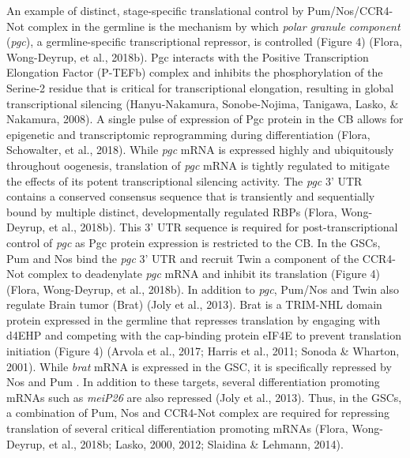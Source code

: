 \documentclass[12pt,oneside]{reedthesis}
\begin{document}
An example of distinct, stage-specific translational control by
Pum/Nos/CCR4-Not complex in the germline is the mechanism by which
\emph{polar granule component} (\emph{pgc}), a germline-specific transcriptional
repressor, is controlled (Figure 4) (Flora, Wong-Deyrup, et al., 2018b). Pgc interacts with
the Positive Transcription Elongation Factor (P-TEFb) complex and
inhibits the phosphorylation of the Serine-2 residue that is critical
for transcriptional elongation, resulting in global transcriptional
silencing (Hanyu-Nakamura, Sonobe-Nojima, Tanigawa, Lasko, \& Nakamura, 2008). A single pulse of expression of Pgc
protein in the CB allows for epigenetic and transcriptomic reprogramming
during differentiation (Flora, Schowalter, et al., 2018). While \emph{pgc} mRNA is expressed
highly and ubiquitously throughout oogenesis, translation of \emph{pgc} mRNA
is tightly regulated to mitigate the effects of its potent
transcriptional silencing activity. The \emph{pgc} 3' UTR contains a
conserved consensus sequence that is transiently and sequentially bound
by multiple distinct, developmentally regulated RBPs (Flora, Wong-Deyrup, et al., 2018b).
This 3' UTR sequence is required for post-transcriptional control of
\emph{pgc} as Pgc protein expression is restricted to the CB. In the GSCs,
Pum and Nos bind the \emph{pgc} 3' UTR and recruit Twin a component of the
CCR4-Not complex to deadenylate \emph{pgc} mRNA and inhibit its translation
(Figure 4) (Flora, Wong-Deyrup, et al., 2018b). In addition to \emph{pgc}, Pum/Nos and Twin also
regulate Brain tumor (Brat) (Joly et al., 2013). Brat is a TRIM-NHL domain
protein expressed in the germline that represses translation by engaging
with d4EHP and competing with the cap-binding protein eIF4E to prevent
translation initiation (Figure 4) (Arvola et al., 2017; Harris et al., 2011; Sonoda \& Wharton, 2001). While \emph{brat} mRNA is expressed in the GSC, it is
specifically repressed by Nos and Pum . In addition to these targets,
several differentiation promoting mRNAs such as \emph{meiP26} are also
repressed (Joly et al., 2013). Thus, in the GSCs, a combination of Pum, Nos
and CCR4-Not complex are required for repressing translation of several
critical differentiation promoting mRNAs (Flora, Wong-Deyrup, et al., 2018b; Lasko, 2000, 2012; Slaidina \& Lehmann, 2014).
\end{document}
